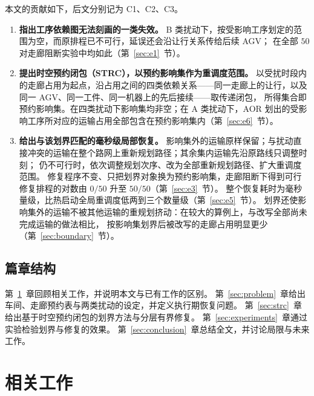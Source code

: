 \documentclass[manuscript,screen,review]{acmart}
\providecommand{\STRC}{\textsc{STRC}}
\newcommand{\NPairs}{50}
\newcommand{\FeasRone}{0/\NPairs}            %
\newcommand{\FeasRtwo}{\NPairs/\NPairs}  %
\begin{document}
本文的贡献如下，后文分别记为 C1、C2、C3。
\begin{enumerate}[label=\textbf{C\arabic*.},leftmargin=2.2em,itemsep=0.4em]
\item \textbf{指出工序依赖图无法刻画的一类失效。}
B 类扰动下，按受影响工序划定的范围为空，而原排程已不可行，延误还会沿让行关系传给后续 AGV；
在全部 \(\NPairs\) 对走廊阻断实验中均如此（第~\ref{sec:e1}~节）。

\item \textbf{提出时空预约闭包（\STRC），以预约影响集作为重调度范围。}
以受扰时段内的走廊占用为起点，沿占用之间的四类依赖关系——同一走廊上的让行，以及同一 AGV、同一工件、同一机器上的先后接续——取传递闭包，
所得集合即预约影响集。在四类扰动下影响集均非空；在 A 类扰动下，AOR 划出的受影响工序所对应的运输占用全部包含在预约影响集内（第~\ref{sec:e6}~节）。

\item \textbf{给出与该划界匹配的毫秒级局部恢复。}
影响集外的运输原样保留；与扰动直接冲突的运输在整个路网上重新规划路径；其余集内运输先沿原路线只调整时刻；
仍不可行时，依次调整规划次序、改为全部重新规划路径、扩大重调度范围。
修复程序不变、只把划界对象换为预约影响集，走廊阻断下得到可行修复排程的对数由 \(\FeasRone\) 升至 \(\FeasRtwo\)（第~\ref{sec:e3}~节）。
整个恢复耗时为毫秒量级，比热启动全局重调度低两到三个数量级（第~\ref{sec:e5}~节）。
划界还使影响集外的运输不被其他运输的重规划挤动：在较大的算例上，与改写全部尚未完成运输的做法相比，
按影响集划界后被改写的走廊占用明显更少（第~\ref{sec:boundary}~节）。
\end{enumerate}

\subsection{篇章结构}

第~\ref{sec:related_work}~章回顾相关工作，并说明本文与已有工作的区别。
第~\ref{sec:problem}~章给出车间、走廊预约表与两类扰动的设定，并定义执行期恢复问题。
第~\ref{sec:strc}~章给出基于时空预约闭包的划界方法与分层有界修复。
第~\ref{sec:experiments}~章通过实验检验划界与修复的效果。
第~\ref{sec:conclusion}~章总结全文，并讨论局限与未来工作。

\section{相关工作}
\label{sec:related_work}
\end{document}
